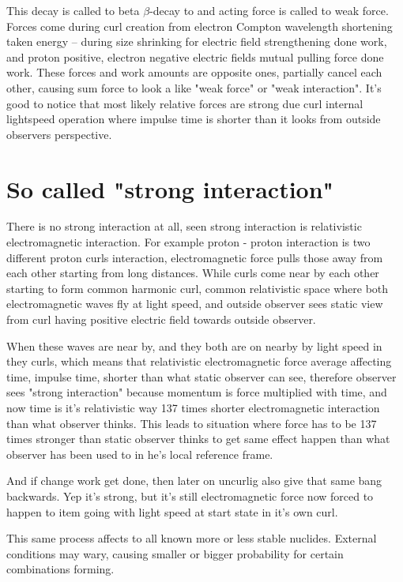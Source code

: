 This decay is called to beta $\beta$-decay to and acting force is called to
weak force. Forces come during curl creation from electron Compton wavelength
shortening taken energy -- during size shrinking for electric field
strengthening done work, and proton positive, electron negative electric fields
mutual pulling force done work. These forces and work amounts are opposite
ones, partially cancel each other, causing sum force to look a like "weak
force" or "weak interaction". It's good to notice that most likely relative
forces are strong due curl internal lightspeed operation where impulse time
is shorter than it looks from outside observers perspective.

\section{So called "strong interaction"}
\label{strong_interaction}

There is no strong interaction at all, seen strong interaction is relativistic
electromagnetic interaction. For example proton - proton interaction is two
different proton curls interaction, electromagnetic force pulls those away from
each other starting from long distances. While curls come near by each other
starting to form common harmonic curl, common relativistic space where both
electromagnetic waves fly at light speed, and outside observer sees static view
from curl having positive electric field towards outside observer.

When these waves are near by, and they both are on nearby by light speed in they
curls, which means that relativistic electromagnetic force average affecting time,
impulse time, shorter than what static observer can see, therefore observer sees
"strong interaction" because momentum is force multiplied with time, and now time
is it's relativistic way 137\cite{FineStructureConst} times shorter electromagnetic
interaction than what observer thinks. This leads to situation where force has
to be 137 times stronger than static observer thinks to get same effect happen
\cite{TimeDilation} than what observer has been used to in he's local reference
frame.

And if change work get done, then later on uncurlig also give that same bang
backwards. Yep it's strong, but it's still electromagnetic force now forced to
happen to item going with light speed at start state in it's own curl.

This same process affects to all known more or less stable nuclides\cite{Nuclides}.
External conditions may wary, causing smaller or bigger probability for certain
combinations forming.

